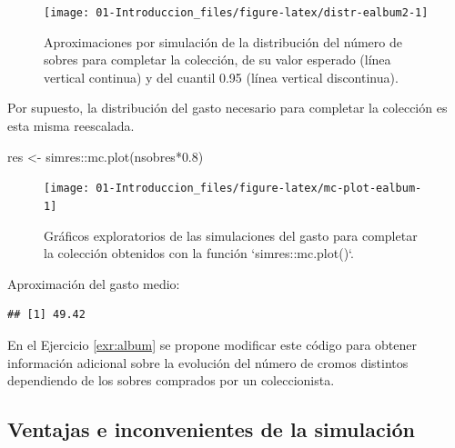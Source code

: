 \documentclass[
]{book}
\newenvironment{Shaded}{\begin{snugshade}}{\end{snugshade}}
\newcommand{\CommentTok}[1]{\textcolor[rgb]{0.56,0.35,0.01}{\textit{#1}}}
\newcommand{\FloatTok}[1]{\textcolor[rgb]{0.00,0.00,0.81}{#1}}
\newcommand{\FunctionTok}[1]{\textcolor[rgb]{0.00,0.00,0.00}{#1}}
\newcommand{\NormalTok}[1]{#1}
\newcommand{\OtherTok}[1]{\textcolor[rgb]{0.56,0.35,0.01}{#1}}
\newcommand{\SpecialCharTok}[1]{\textcolor[rgb]{0.00,0.00,0.00}{#1}}
\theoremstyle{break}
\theoremstyle{nonumberplain}
\begin{document}
\begin{figure}[!htb]

{\centering \texttt{[image: 01-Introduccion\_files/figure-latex/distr-ealbum2-1]} 

}

\caption{Aproximaciones por simulación de la distribución del número de sobres para completar la colección, de su valor esperado (línea vertical continua) y del cuantil 0.95 (línea vertical discontinua).}\label{fig:distr-ealbum2}
\end{figure}

Por supuesto, la distribución del gasto necesario para completar la colección es esta misma reescalada.

\begin{Shaded}
\begin{Highlighting}[]
\NormalTok{res }\OtherTok{\textless{}{-}}\NormalTok{ simres}\SpecialCharTok{::}\FunctionTok{mc.plot}\NormalTok{(nsobres}\SpecialCharTok{*}\FloatTok{0.8}\NormalTok{)}
\end{Highlighting}
\end{Shaded}

\begin{figure}[!htb]

{\centering \texttt{[image: 01-Introduccion\_files/figure-latex/mc-plot-ealbum-1]} 

}

\caption{Gráficos exploratorios de las simulaciones del gasto para completar la colección obtenidos con la función `simres::mc.plot()`.}\label{fig:mc-plot-ealbum}
\end{figure}

Aproximación del gasto medio:

\begin{Shaded}
\end{Shaded}

\begin{verbatim}
## [1] 49.42
\end{verbatim}

En el Ejercicio \ref{exr:album} se propone modificar este código para obtener información adicional sobre la evolución del número de cromos distintos dependiendo de los sobres comprados por un coleccionista.

\hypertarget{ventajas-e-inconvenientes-de-la-simulaciuxf3n}{%
\subsection{Ventajas e inconvenientes de la simulación}\label{ventajas-e-inconvenientes-de-la-simulaciuxf3n}}
\end{document}
